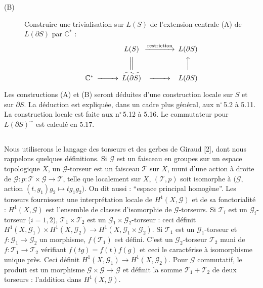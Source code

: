 \documentclass[12pt,a4paper]{article}
\theoremstyle{plain}
\theoremstyle{definition}
\theoremstyle{remark}
\newcommand{\C}{\mathbb{C}}
\begin{document}
\begin{description}
\item[(B)] Construire une trivialisation sur $L(S)$ de l'extension centrale (A) de $L(\partial S)$
par $\C^*$ :
\[
\begin{CD}
@. L(S) @>{\text{restriction}}>> L(\partial S) \\
@. @| @AAA \\
\C^* @>>> \widetilde{L(\partial S)} @>>> L(\partial S)
\end{CD}
\]
\end{description}

Les constructions (A) et (B) seront déduites d'une construction locale sur $S$ et sur $\partial S$. La
déduction est expliquée, dans un cadre plus général, aux n${}^\circ$\,5.2 à 5.11. La construction
locale est faite aux n${}^\circ$\,5.12 à 5.16. Le commutateur pour $L(\partial S)^\sim$ est calculé en 5.17.

\subsection{}

Nous utiliserons le langage des torseurs et des gerbes de Giraud [2], dont
nous rappelons quelques définitions. Si $\mathscr{G}$ est un faisceau en groupes sur un espace
topologique $X$, un $\mathscr{G}$-torseur est un faisceau $\mathscr{T}$ sur $X$, muni d'une action à droite de
$\mathscr{G} : p : \mathscr{T} \times \mathscr{G} \to \mathscr{T}$, telle que localement sur $X$, $(\mathscr{T}, p)$ soit isomorphe à $(\mathscr{G}$, action
$(t, g_1)g_2 \mapsto tg_1g_2)$. On dit aussi : ``espace principal homogène''. Les torseurs fournissent
une interprétation locale de $H^1(X, \mathscr{G})$ et de sa fonctorialité : $H^1(X, \mathscr{G})$ est l'ensemble
de classes d'isomorphie de $\mathscr{G}$-torseurs. Si $\mathscr{T}_i$ est un $\mathscr{G}_i$-torseur ($i = 1, 2$), $\mathscr{T}_1 \times \mathscr{T}_2$
est un $\mathscr{G}_1 \times \mathscr{G}_2$-torseur : ceci définit $H^1(X, \mathscr{G}_1) \times H^1(X, \mathscr{G}_2) \to H^1(X, \mathscr{G}_1 \times \mathscr{G}_2)$.
Si $\mathscr{T}_1$ est un $\mathscr{G}_1$-torseur et $f : \mathscr{G}_1 \to \mathscr{G}_2$ un morphisme, $f(\mathscr{T}_1)$ est défini. C'est un $\mathscr{G}_2$-torseur
$\mathscr{T}_2$ muni de $f : \mathscr{T}_1 \to \mathscr{T}_2$ vérifiant $f(tg) = f(t)f(g)$ et ceci le caractérise à isomorphisme
unique près. Ceci définit $H^1(X, \mathscr{G}_1) \to H^1(X, \mathscr{G}_2)$. Pour $\mathscr{G}$ commutatif, le produit est
un morphisme $\mathscr{G} \times \mathscr{G} \to \mathscr{G}$ et définit la somme $\mathscr{T}_1 + \mathscr{T}_2$ de deux torseurs : l'addition
dans $H^1(X, \mathscr{G})$.
\end{document}
